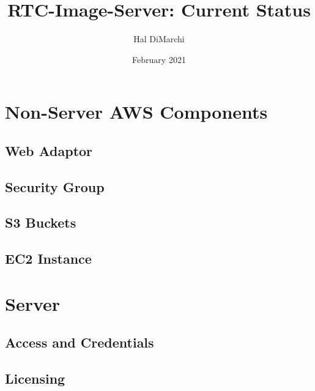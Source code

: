 \documentclass[11pt,legalpaper]{article}
\begin{document}
  \title{RTC-Image-Server: Current Status}
  \author{Hal DiMarchi}
  \date{February 2021}
  \maketitle
  \newpage
  \tableofcontents
  \newpage
  \section{Non-Server AWS Components}
    \subsection{Web Adaptor}
    \subsection{Security Group}
    \subsection{S3 Buckets}
    \subsection{EC2 Instance}
  \section{Server}
    \subsection{Access and Credentials}
    \subsection{Licensing}
\end{document}
